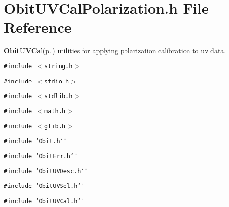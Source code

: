 \section{Obit\-UVCal\-Polarization.h File Reference}
\label{ObitUVCalPolarization_8h}
{\bf Obit\-UVCal}{\rm (p.\,\pageref{structObitUVCal})} utilities for applying polarization calibration to uv data. 

{\tt \#include $<$string.h$>$}\par
{\tt \#include $<$stdio.h$>$}\par
{\tt \#include $<$stdlib.h$>$}\par
{\tt \#include $<$math.h$>$}\par
{\tt \#include $<$glib.h$>$}\par
{\tt \#include \char`\"{}Obit.h\char`\"{}}\par
{\tt \#include \char`\"{}Obit\-Err.h\char`\"{}}\par
{\tt \#include \char`\"{}Obit\-UVDesc.h\char`\"{}}\par
{\tt \#include \char`\"{}Obit\-UVSel.h\char`\"{}}\par
{\tt \#include \char`\"{}Obit\-UVCal.h\char`\"{}}\par
